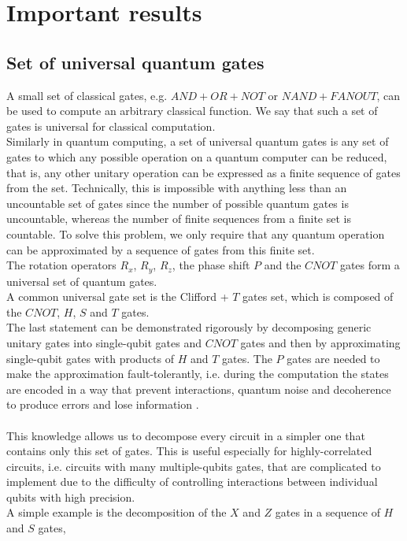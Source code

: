 \section{Important results}
\subsection{Set of universal quantum gates}
A small set of classical gates, e.g. $AND+OR+NOT$ or $NAND+FANOUT$, can be used to compute an arbitrary classical function. We say that such a set of gates is universal for classical computation. \\
Similarly in quantum computing, a set of universal quantum gates is any set of gates to which any possible operation on a quantum computer can be reduced, that is, any other unitary operation can be expressed as a finite sequence of gates from the set. Technically, this is impossible with anything less than an uncountable set of gates since the number of possible quantum gates is uncountable, whereas the number of finite sequences from a finite set is countable. To solve this problem, we only require that any quantum operation can be approximated by a sequence of gates from this finite set. \\
The rotation operators $R_x$, $R_y$, $R_z$, the phase shift $P$ and the $CNOT$ gates form a universal set of quantum gates. \\
A common universal gate set is the Clifford + $T$ gates set, which is composed of the $CNOT$, $H$, $S$ and $T$ gates. \\
The last statement can be demonstrated rigorously by decomposing generic unitary gates into single-qubit gates and $CNOT$ gates and then by approximating single-qubit gates with products of $H$ and $T$ gates. The $P$ gates are needed to make the approximation fault-tolerantly, i.e. during the computation the states are encoded in a way that prevent interactions, quantum noise and decoherence to produce errors and lose information \cite{Nielsen2010Dec}. \\
\\
This knowledge allows us to decompose every circuit in a simpler one that contains only this set of gates. This is useful especially for highly-correlated circuits, i.e. circuits with many multiple-qubits gates, that are complicated to implement due to the difficulty of controlling interactions between individual qubits with high precision. \\
A simple example is the decomposition of the $X$ and $Z$ gates in a sequence of $H$ and $S$ gates,

